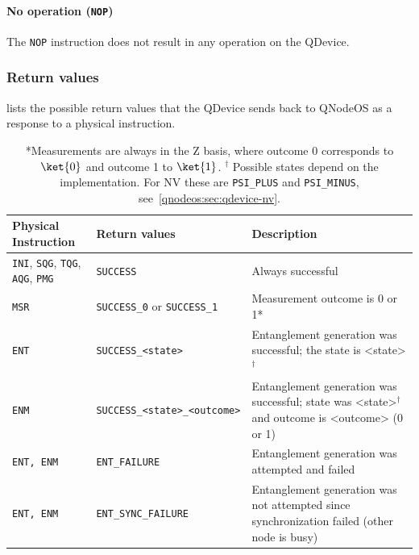 \paragraph{No operation (\texttt{NOP})}

The \texttt{NOP} instruction does not result in any operation on the \ac{QDevice}.

\subsubsection{Return values}
 lists the possible return values that the QDevice sends back to QNodeOS as a response to a physical instruction.

\begin{table}[htpb]
    \centering
    \begin{tabularx}{\textwidth}{|l|l|X|}
    \hline
    Physical Instruction & Return values & Description \\ 
    \hline
    \texttt{INI}, \texttt{SQG}, \texttt{TQG}, \texttt{AQG}, \texttt{PMG} & \texttt{SUCCESS} & Always successful \\
    \texttt{MSR} & \texttt{SUCCESS\_0} or \texttt{SUCCESS\_1} & Measurement outcome is 0 or 1* \\ 
    \texttt{ENT} & \texttt{SUCCESS\_<state>} & Entanglement generation was successful; the state is <state>$^\dagger$ \\
    \texttt{ENM} & \texttt{SUCCESS\_<state>\_<outcome>} & Entanglement generation was successful; state was <state>$^\dagger$ and outcome is <outcome> (0 or 1) \\
    \texttt{ENT, ENM} & \texttt{ENT\_FAILURE} & Entanglement generation was attempted and failed \\
    \texttt{ENT, ENM} & \texttt{ENT\_SYNC\_FAILURE} & Entanglement generation was not attempted since synchronization failed (other node is busy) \\
    \hline
    \end{tabularx}
    \caption{*Measurements are always in the Z basis, where outcome 0 corresponds to $\ket{0}$ and outcome 1 to $\ket{1}$. $^\dagger$ Possible states depend on the implementation. For NV these are \texttt{PSI\_PLUS} and \texttt{PSI\_MINUS}, see~\cref{qnodeos:sec:qdevice-nv}.}
    \label{tab:qdevice-return-values}
\end{table}
